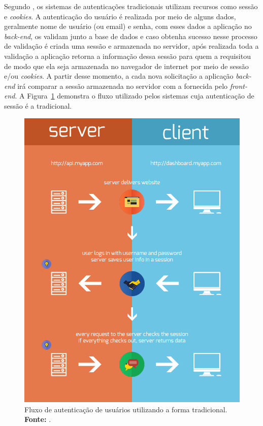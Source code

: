 Segundo , os sistemas de autenticações tradicionais utilizam recursos como sessão e \textit{cookies}. A autenticação do usuário é realizada por meio de alguns dados, geralmente nome de usuário (ou email) e senha, com esses dados a aplicação no \textit{back-end}, os validam junto a base de dados e caso obtenha sucesso nesse processo de validação é criada uma sessão e armazenada no servidor, após realizada toda a validação a aplicação retorna a informação dessa sessão para quem a requisitou de modo que ela seja armazenada no navegador de internet por meio de sessão e/ou \textit{cookies}. A partir desse momento, a cada nova solicitação a aplicação \textit{back-end} irá comparar a sessão armazenada no servidor com a fornecida pelo \textit{front-end}. A Figura~\ref{fig:autenticacao_via_sessao} demonstra o fluxo utilizado pelos sistemas cuja autenticação de sessão é a tradicional.

\begin{figure}[h!]
	\centerline{\includegraphics[scale=0.5]{./imagens/tokens-traditional.png}}
	\caption[Fluxo de autenticação de usuários utilizando a forma tradicional]
	{Fluxo de autenticação de usuários utilizando a forma tradicional. \textbf{Fonte:} \cite{authentication_via_token_chris_sevilleja}.}
	\label{fig:autenticacao_via_sessao}
\end{figure}

